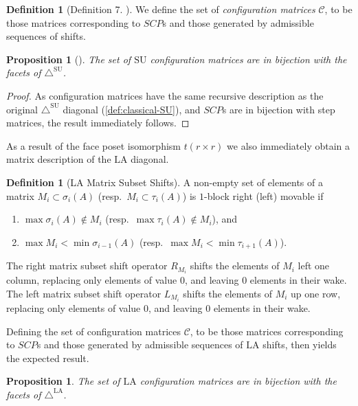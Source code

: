 \documentclass{amsart}
\newtheorem{proposition}[theorem]{Proposition}
\theoremstyle{definition}
\newtheorem{definition}[theorem]{Definition}
\newcommand{\SU}{\mathrm{SU}}
\newcommand{\LA}{\mathrm{LA}}
\newcommand{\SUD}{\triangle^{\mathrm{SU}}}
\newcommand{\LAD}{\triangle^{\mathrm{LA}}}
\begin{document}
\begin{definition}[Definition 7. \cite{SaneblidzeUmble04}]
We define the set of \emph{configuration matrices} $\mathcal{C}$, to be those matrices  corresponding to $SCP$s and those generated by admissible sequences of shifts.
\end{definition}

\begin{proposition}[\cite{SaneblidzeUmble04}]
The set of $\SU$ configuration matrices are in bijection with the facets of $\SUD$.
\end{proposition}
\begin{proof}
As configuration matrices have the same recursive description as the original $\SUD$ diagonal (\cref{def:classical-SU}), and $SCP$s are in bijection with step matrices, the result immediately follows.
\end{proof}

As a result of the face poset isomorphism $t(r\times r)$ we also immediately obtain a matrix description of the $\LA$ diagonal.
\begin{definition}[LA Matrix Subset Shifts]
A non-empty set of elements of a matrix $M_i \subset \sigma_i(A)$ (resp.~$M_{i}\subset \tau_{i}(A)$) is $1$-block right (left) movable if
\begin{enumerate}
    \item $\max \sigma_i(A) \notin M_i$ (resp.~$\max \tau_{i}(A) \notin M_i$), and
    \item $\max M_i < \min \sigma_{i-1}(A)$ (resp.~$\max M_{i} < \min \tau_{i+1}(A)$).
\end{enumerate}
The right matrix subset shift operator $R_{M_i}$ shifts the elements of $M_i$ left one column, replacing only elements of value $0$, and leaving $0$ elements in their wake.
The left matrix subset shift operator $L_{M_i}$ shifts the elements of $M_i$ up one row, replacing only elements of value $0$, and leaving $0$ elements in their wake.
\end{definition}
Defining the set of configuration matrices $\mathcal{C}$, to be those matrices  corresponding to $SCP$s and those generated by admissible sequences of $\LA$ shifts, then yields the expected result.
\begin{proposition}
The set of $\LA$ configuration matrices are in bijection with the facets of $\LAD$.
\end{proposition}
\end{document}
